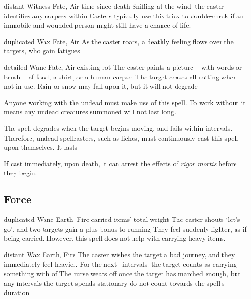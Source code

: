 \begin{multicols}{2}

  {distant}%
  {Witness}%
  {Fate, Air}%
  {time since death}%
  {Sniffing at the wind, the caster identifies any corpses within \spellRange}%
  {
    Casters typically use this trick to double-check if an immobile and wounded person might still have a chance of life.
  }

  {duplicated}%
  {Wax}%
  {Fate, Air}%
  {}%
  {As the caster roars, a deathly feeling flows over the targets, who gain  \glspl{fatigue}}%
  {}

  {detailed}%
  {Wane}%
  {Fate, Air}%
  {existing rot}%
  {The caster paints a picture -- with words or brush -- of food, a shirt, or a human corpse.
  The target ceases all rotting when not in use.
  Rain or snow may fall upon it, but it will not degrade}%
  {
    Anyone working with the undead must make use of this spell.
    To work without it means any undead creatures summoned will not last long.

    The spell degrades when the target begins moving, and fails within  \glspl{interval}.
    Therefore, undead spellcasters, such as liches, must continuously cast this spell upon themselves.
    It lasts

    If cast immediately, upon death, it can arrest the effects of \textit{rigor mortis} before they begin.
  }


\subsection{Force}


  {duplicated}%
  {Wane}%
  {Earth, Fire}%
  {carried items' total \gls{weight}}%
  {The caster shouts `let's go', and two targets gain a plus  bonus to running}%
  {They feel suddenly lighter, as if being carried.
  However, this spell does not help with carrying heavy items.}

  {distant}%
  {Wax}%
  {Earth, Fire}%
  {}%
  {The caster wishes the target a bad journey, and they immediately feel heavier.
  For the next ~\glspl{interval}, the target counts as carrying something with  of }%
  {
  The curse wears off once the target has marched enough, but any \glspl{interval} the target spends stationary do not count towards the spell's duration.}


\end{multicols}
